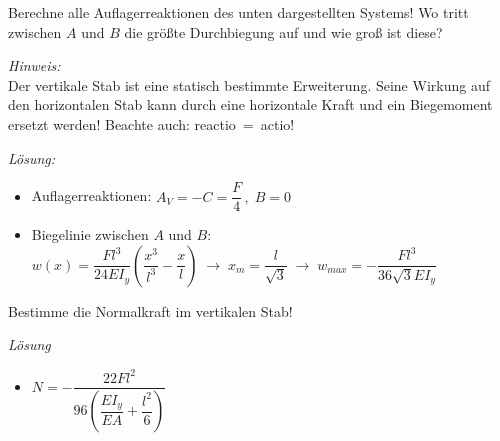 \begin{example}
	Berechne alle Auflagerreaktionen des unten dargestellten Systems! Wo tritt zwischen $A$ und $B$ die größte Durchbiegung auf und wie groß ist diese?
	\begin{center}
		
	\end{center}
	\textit{Hinweis:}\\
	Der vertikale Stab ist eine statisch bestimmte Erweiterung. Seine Wirkung auf den horizontalen Stab kann durch eine horizontale Kraft und ein Biegemoment ersetzt werden! Beachte auch: reactio~=~actio! 
	\begin{center}
		
	\end{center}
	
	\textit{Lösung:}
	\begin{itemize}
		\item Auflagerreaktionen: $A_V = -C = \dfrac{F}{4}\,,\; B=0$
		\item Biegelinie zwischen $A$ und $B$: $w(x) = \dfrac{Fl^3}{24EI_y}\left(\dfrac{x^3}{l^3}-\dfrac{x}{l}\right)\;\rightarrow\;x_m=\dfrac{l}{\sqrt{3}}\;\rightarrow\;w_{max} = -\dfrac{Fl^3}{36\sqrt{3}EI_y}$
	\end{itemize}
\end{example}

\begin{example}
	Bestimme die Normalkraft im vertikalen Stab!
	\begin{center}
		
	\end{center}
	
	\textit{Lösung}
	\begin{itemize}
		\item $N=-\dfrac{22Fl^2}{96\left(\dfrac{EI_y}{EA}+\dfrac{l^2}{6}\right)}$
	\end{itemize}
\end{example}